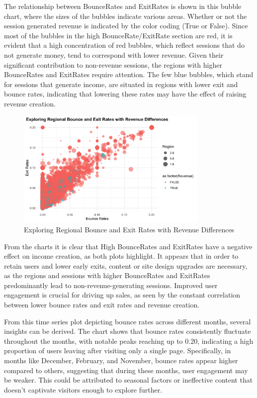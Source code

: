 \documentclass[12pt]{article}
\begin{document}
\FloatBarrier
The relationship between BounceRates and ExitRates is shown in this bubble chart, where the sizes of the bubbles indicate various areas. Whether or not the session generated revenue is indicated by the color coding (True or False). Since most of the bubbles in the high BounceRate/ExitRate section are red, it is evident that a high concentration of red bubbles, which reflect sessions that do not generate money, tend to correspond with lower revenue. Given their significant contribution to non-revenue sessions, the regions with higher BounceRates and ExitRates require attention. The few blue bubbles, which stand for sessions that generate income, are situated in regions with lower exit and bounce rates, indicating that lowering these rates may have the effect of raising revenue creation.
\begin{figure}[h]
    \centering
    \includegraphics[width=0.82\textwidth]{Exploring Regional Bounce and Exit Rates with Revenue Differences.png}  
    \caption{Exploring Regional Bounce and Exit Rates with Revenue Differences}
\end{figure}
\vspace{0.5cm}

From the charts it is clear that High BounceRates and ExitRates have a negative effect on income creation, as both plots highlight. It appears that in order to retain users and lower early exits, content or site design upgrades are necessary, as the regions and sessions with higher BounceRates and ExitRates predominantly lead to non-revenue-generating sessions. Improved user engagement is crucial for driving up sales, as seen by the constant correlation between lower bounce rates and exit rates and revenue creation.

\FloatBarrier
From this time series plot depicting bounce rates across different months, several insights can be derived. The chart shows that bounce rates consistently fluctuate throughout the months, with notable peaks reaching up to 0.20, indicating a high proportion of users leaving after visiting only a single page. Specifically, in months like December, February, and November, bounce rates appear higher compared to others, suggesting that during these months, user engagement may be weaker. This could be attributed to seasonal factors or ineffective content that doesn't captivate visitors enough to explore further.
\end{document}
